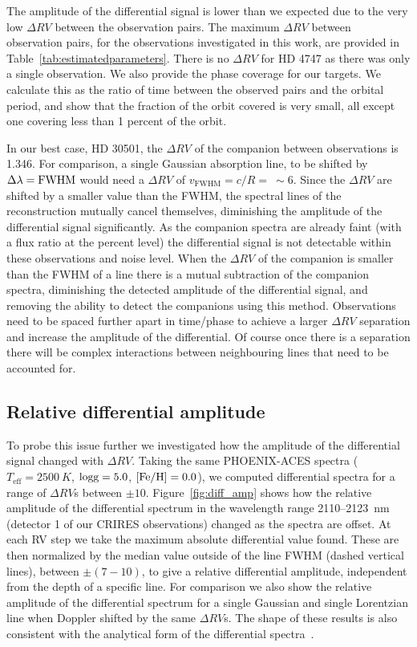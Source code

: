     The amplitude of the differential signal is lower than we expected due to the very low \(\Delta RV\) between the observation pairs. The maximum \(\Delta RV\) between observation pairs, for the observations investigated in this work, are provided in Table~\ref{tab:estimatedparameters}. {\red{} There is no \(\Delta RV\) for {HD 4747} as there was only a single observation. We also provide the phase coverage for our targets. We calculate this as the ratio of time between the observed pairs and the orbital period, and show that the fraction of the orbit covered is very small, all except one covering less than 1 percent of the orbit.}

    In our best case, {HD 30501}, the \(\Delta RV\) of the companion between observations is 1.346\kmps{}. For comparison, a single Gaussian absorption line, to be shifted by \(\Delta\lambda = \rm FWHM\) would need a \(\Delta RV\) of \(v_{\textrm{FWHM}} = c/R =~\sim6\)\kmps{}. Since the \(\Delta RV\) are shifted by a smaller value than the FWHM, the spectral lines of the reconstruction mutually cancel themselves, diminishing the amplitude of the differential signal significantly. As the companion spectra are already faint (with a flux ratio at the percent level) the differential signal is not detectable within these observations and noise level.
    When the \(\Delta RV \) of the companion is smaller than the FWHM of a line there is a mutual subtraction of the companion spectra, diminishing the detected amplitude of the differential signal, and removing the ability to detect the companions using this method. Observations need to be spaced further apart in time/phase to achieve a larger \(\Delta RV\) separation and increase the amplitude of the differential. Of course once there is a separation there will be complex interactions between neighbouring lines that need to be accounted for.

    \subsection{Relative differential amplitude}
    To probe this issue further we investigated how the amplitude of the differential signal changed with \(\Delta RV \). Taking the same PHOENIX-ACES spectra (\(T_{\textrm{eff}} = 2500~K \), \(\rm logg=5.0 \), \(\rm [Fe/H]=0.0 \)), we computed differential spectra for a range of \(\Delta RV\)s between \(\pm10\)\kmps{}. Figure~\ref{fig:diff_amp} shows how the relative amplitude of the differential spectrum in the wavelength range 2110--2123~nm (detector 1 of our CRIRES observations) changed as the spectra are offset. At each RV step we take the maximum absolute differential value found. These are then normalized by the median value outside of the line FWHM (dashed vertical lines), between \(\pm(7-10)\)\kmps{}, to give a relative differential amplitude, independent from the depth of a specific line. For comparison we also show the relative amplitude of the differential spectrum for a single Gaussian and single Lorentzian line when Doppler shifted by the same \(\Delta RV \)s. The shape of these results is also consistent with the analytical form of the differential spectra~\citet[][eqn.~A.1]{ferluga_separating_1997}.

